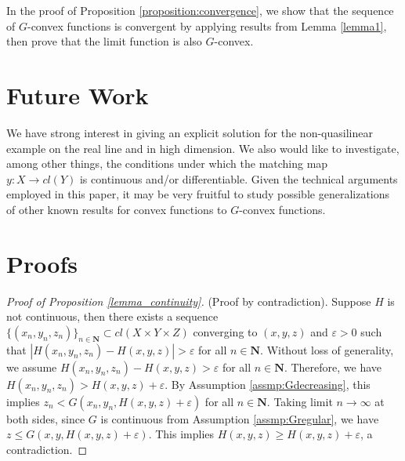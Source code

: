 \documentclass[a4paper, 11pt]{amsart}
\numberwithin{equation}{section}
\theoremstyle{plain}
\theoremstyle{definition}
\theoremstyle{remark}
\newcommand{\N}{\mathbf{N}}
\begin{document}
In the proof of Proposition \ref{proposition:convergence}, we show that the sequence of $G$-convex functions is convergent by applying results from Lemma \ref{lemma1}, then prove that the limit function is also $G$-convex. \medskip



\bigskip





\section{Future Work}\label{section:futurework}

We have strong interest in giving an explicit solution for the non-quasilinear example on the real line and in high dimension. We also would like to investigate, among other things, the conditions under which the matching map $y: X \longrightarrow cl(Y)$ is continuous and/or differentiable. Given the technical arguments employed in this paper, it may be very fruitful to study possible generalizations of other known results for convex functions to $G$-convex functions.




\bigskip



\section{Proofs}\label{section:proofs}

\begin{proof}[Proof of Proposition \ref{lemma_continuity}]
	(Proof by contradiction). Suppose $H$ is not continuous, then there exists a sequence $\{(x_n, y_n, z_n)\}_{n\in \N} \subset cl(X\times Y \times Z)$ converging to $(x, y, z)$ and $\varepsilon >0$ such that $|H(x_n, y_n, z_n) - H(x,y,z)|>\varepsilon$ for all $n\in \N$. Without loss of generality, we assume $H(x_n, y_n, z_n) - H(x,y,z)>\varepsilon$ for all $n\in \N$. Therefore, we have $H(x_n, y_n, z_n) > H(x,y,z)+\varepsilon$. By Assumption \ref{assmp:Gdecreasing}, this implies $z_n < G(x_n, y_n, H(x,y,z)+\varepsilon)$ for all $n\in \N$. Taking limit $n\longrightarrow \infty$ at both sides, since $G$ is continuous from Assumption \ref{assmp:Gregular}, we have $z \le G(x, y, H(x,y,z)+\varepsilon)$. This implies $H(x,y,z) \ge H(x,y,z)+\varepsilon$, a contradiction.
\end{proof}

\vspace{0.3cm}
\end{document}
